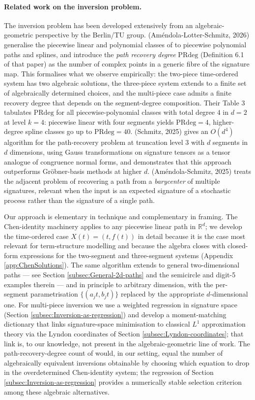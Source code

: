 \documentclass[12pt,english]{article}
\theoremstyle{remark}
\begin{document}
\paragraph{Related work on the inversion problem.}
The inversion problem has been developed extensively from an algebraic-geometric
perspective by the Berlin/TU group. \cite{splines} (Améndola-Lotter-Schmitz,
2026) generalise the piecewise linear and polynomial classes of \cite{varieties}
to piecewise polynomial paths and splines, and introduce the \emph{path
recovery degree} $\mathrm{PRdeg}$ (Definition 6.1 of that paper) as
the number of complex points in a generic fibre of the signature map.
This formalises what we observe empirically: the two-piece time-ordered
system has two algebraic solutions, the three-piece system extends
to a finite set of algebraically determined choices, and the multi-piece
case admits a finite recovery degree that depends on the segment-degree
composition. Their Table 3 tabulates $\mathrm{PRdeg}$ for all piecewise-polynomial
classes with total degree $4$ in $d=2$ at level $k=4$: piecewise linear
with four segments yields $\mathrm{PRdeg}=4$, higher-degree spline
classes go up to $\mathrm{PRdeg}=40$. \cite{tensorlearning} (Schmitz,
2025) gives an $O(d^{4})$ algorithm for the path-recovery problem
at truncation level $3$ with $d$ segments in $d$ dimensions, using
Gauss transformations on signature tensors as a tensor analogue of
congruence normal forms, and demonstrates that this approach outperforms
Gröbner-basis methods at higher $d$. \cite{barycenters} (Améndola-Schmitz,
2025) treats the adjacent problem of recovering a path from a \emph{barycenter}
of multiple signatures, relevant when the input is an expected signature
of a stochastic process rather than the signature of a single path.

Our approach is elementary in technique and complementary in framing.
The Chen-identity machinery applies to any piecewise linear path in
$\mathbb{R}^{d}$; we develop the time-ordered case $X(t)=(t,f(t))$
in detail because it is the case most relevant for term-structure
modelling and because the algebra closes with closed-form expressions
for the two-segment and three-segment systems (Appendix \ref{app:ChenSolutions}).
The same algorithm extends to general two-dimensional paths --- see
Section \ref{subsec:General-2d-paths} and the semicircle and digit-5
examples therein --- and in principle to arbitrary dimension, with
the per-segment parametrisation $\{(a_{j}t,b_{j}t)\}$ replaced by
the appropriate $d$-dimensional one. For multi-piece inversion we
use a weighted regression in signature space (Section \ref{subsec:Inversion-as-regression})
and develop a moment-matching dictionary that links signature-space
minimisation to classical $L^{1}$ approximation theory via the Lyndon
coordinates of Section \ref{subsec:Lyndon-coordinates}; that link
is, to our knowledge, not present in the algebraic-geometric line
of work. The path-recovery-degree count of \cite{splines} would, in
our setting, equal the number of algebraically equivalent inversions
obtainable by choosing which equation to drop in the overdetermined
Chen-identity system; the regression of Section \ref{subsec:Inversion-as-regression}
provides a numerically stable selection criterion among these algebraic
alternatives.
\end{document}
